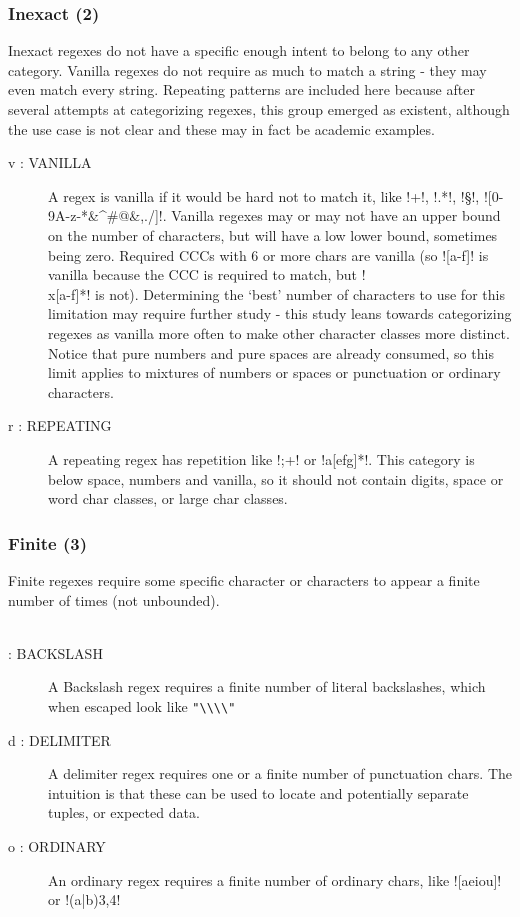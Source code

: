 \subsubsection{Inexact (2)}
Inexact regexes do not have a specific enough intent to belong to any other category.  Vanilla regexes do not require as much to match a string - they may even match every string. Repeating patterns are included here because after several attempts at categorizing regexes, this group emerged as existent, although the use case is not clear and these may in fact be academic examples.
\begin{description}
\item[ v : VANILLA ] A regex is vanilla if it would be hard not to match it, like \cverb!\w+!, \cverb!.*!, \cverb!\S!, \cverb![0-9A-z-*&^#@&,./]!.  Vanilla regexes may or may not have an upper bound on the number of characters, but will have a low lower bound, sometimes being zero.  Required CCCs with 6 or more chars are vanilla (so \cverb![a-f]! is vanilla because the CCC is required to match, but \cverb!\\x[a-f]*! is not).  Determining the `best' number of characters to use for this limitation may require further study - this study leans towards categorizing regexes as vanilla more often to make other character classes more distinct.  Notice that pure numbers and pure spaces are already consumed, so this limit applies to mixtures of numbers or spaces or punctuation or ordinary characters.
\item[ r : REPEATING ] A repeating regex has repetition like \cverb!;+! or \cverb!a[efg]*!.  This category is below space, numbers and vanilla, so it should not contain digits, space or word char classes, or large char classes.
\end{description}

\subsubsection{Finite (3)}
Finite regexes require some specific character or characters to appear a finite number of times (not unbounded).
\begin{description}
\item[ \\ : BACKSLASH ]   A Backslash regex requires a finite number of literal backslashes, which when escaped look like \verb!"\\\\"!
\item[ d : DELIMITER ] A delimiter regex requires one or a finite number of punctuation chars.  The intuition is that these can be used to locate and potentially separate tuples, or expected data.
\item[ o : ORDINARY ] An ordinary regex requires a finite number of ordinary chars, like \cverb![aeiou]! or \cverb!(a|b){3,4}!
\end{description}

